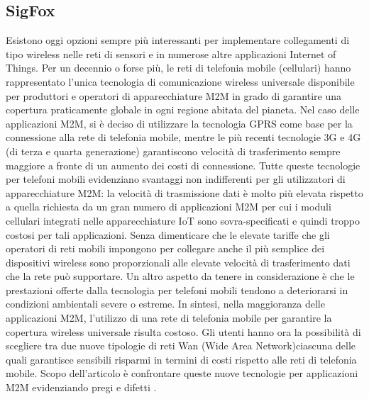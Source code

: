 \documentclass[a4paper]{report} %
\begin{document}
\subsection{SigFox}
Esistono oggi opzioni sempre più interessanti per implementare collegamenti di tipo wireless nelle reti di sensori e in numerose altre applicazioni Internet of Things. Per un decennio o forse più, le reti di telefonia mobile (cellulari) hanno rappresentato l'unica tecnologia di comunicazione wireless universale disponibile per produttori e operatori di apparecchiature M2M in grado di garantire una copertura praticamente globale in ogni regione abitata del pianeta. Nel caso delle applicazioni M2M, si è deciso di utilizzare la tecnologia GPRS come base per la connessione alla rete di telefonia mobile, mentre le più recenti tecnologie 3G e 4G (di terza e quarta generazione) garantiscono velocità di trasferimento sempre maggiore a fronte di un aumento dei costi di connessione. Tutte queste tecnologie per telefoni mobili evidenziano svantaggi non indifferenti per gli utilizzatori di apparecchiature M2M: la velocità di trasmissione dati è molto più elevata rispetto a quella richiesta da un gran numero di applicazioni M2M per cui i moduli cellulari integrati nelle apparecchiature IoT sono sovra-specificati e quindi troppo costosi per tali applicazioni. Senza dimenticare che le elevate tariffe che gli operatori di reti mobili impongono per collegare anche il più semplice dei dispositivi wireless sono proporzionali alle elevate velocità di trasferimento dati che la rete può supportare. Un altro aspetto da tenere in considerazione è che le prestazioni offerte dalla tecnologia per telefoni mobili tendono a deteriorarsi in condizioni ambientali severe o estreme. In sintesi, nella maggioranza delle applicazioni M2M, l'utilizzo di una rete di telefonia mobile per garantire la copertura wireless universale risulta costoso. Gli utenti hanno ora la possibilità di scegliere tra due nuove tipologie di reti Wan (Wide Area Network)ciascuna delle quali garantisce sensibili risparmi in termini di costi rispetto alle reti di telefonia mobile. Scopo dell'articolo è confrontare queste nuove tecnologie per applicazioni M2M evidenziando pregi e difetti \cite{art:rif.23}.
\end{document}
